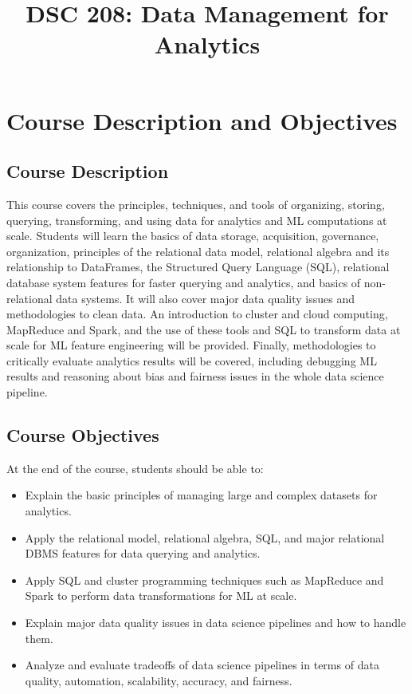 \documentclass{article}
\title{DSC 208: Data Management for Analytics}
\author{}
\date{}
\begin{document}
\maketitle

\section*{Course Description and Objectives}
\subsection*{Course Description}
This course covers the principles, techniques, and tools of organizing, storing, querying, transforming, and using data for analytics and ML computations at scale. Students will learn the basics of data storage, acquisition, governance, organization, principles of the relational data model, relational algebra and its relationship to DataFrames, the Structured Query Language (SQL), relational database system features for faster querying and analytics, and basics of non-relational data systems. It will also cover major data quality issues and methodologies to clean data. An introduction to cluster and cloud computing, MapReduce and Spark, and the use of these tools and SQL to transform data at scale for ML feature engineering will be provided. Finally, methodologies to critically evaluate analytics results will be covered, including debugging ML results and reasoning about bias and fairness issues in the whole data science pipeline.

\subsection*{Course Objectives}
At the end of the course, students should be able to:
\begin{itemize}
    \item Explain the basic principles of managing large and complex datasets for analytics.
    \item Apply the relational model, relational algebra, SQL, and major relational DBMS features for data querying and analytics.
    \item Apply SQL and cluster programming techniques such as MapReduce and Spark to perform data transformations for ML at scale.
    \item Explain major data quality issues in data science pipelines and how to handle them.
    \item Analyze and evaluate tradeoffs of data science pipelines in terms of data quality, automation, scalability, accuracy, and fairness.
\end{itemize}
\end{document}
